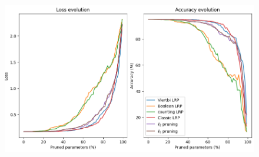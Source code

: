 \documentclass[aspectratio=169]{beamer}
\theoremstyle{definition}
\begin{document}
\begin{frame}
    \begin{figure}
        \includegraphics[width=.9\textwidth]{pruning-graph-large.png}
    \end{figure}
\end{frame}


\end{document}
